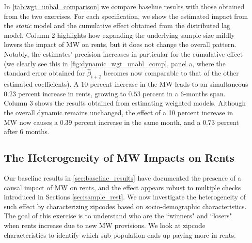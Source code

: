 In \autoref{tab:wgt_unbal_comparison} we compare baseline results with those obtained from the 
two exercises. For each specification, we show the estimated impact
from the \textit{static} model and the cumulative effect obtained from the distributed lag model. Column 
2 highlights how expanding the underlying sample size mildly lowers the impact of MW on rents, but 
it does not change the overall pattern. Notably, the estimates' precision increases in particular for 
the cumulative effect (we clearly see this in \autoref{fig:dynamic_wgt_unabl_comp}, panel a, where 
the standard error obtained for $\hat{\beta}_{t+2}$  becomes now comparable to 
that of the other estimated coefficients). A 10 percent increase in the MW leads to an simultaneous 
$0.23$ percent increase in rents, growing to $0.53$ percent in a 6-months span. Column 3 shows 
the results obtained from estimating weighted models. Although the overall dynamic remains unchanged, 
the effect of a 10 percent increase in MW now causes a $0.39$ percent increase in the same month, and 
a $0.73$ percent after 6 months. %



\subsection{The Heterogeneity of MW Impacts on Rents}\label{sec:heter}

Our baseline results in \autoref{sec:baseline_results} have documented the presence of a causal 
impact of MW on rents, and the effect appears robust to multiple checks introduced in Sections 
\ref{sec:sample_rest}. We now investigate the heterogeneity of such effect 
by characterizing zipcodes based on socio-demographic characteristics. The goal of this exercise is 
to understand who are the ``winners" and ``losers" when rents increase 
due to new MW provisions. We look at zipcode characteristics to identify which sub-population ends 
up paying more in rents.

